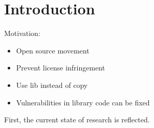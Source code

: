 
\chapter{Introduction}\label{chapter:introduction}
Motivation:
\begin{itemize}
    \item Open source movement
    \item Prevent license infringement
    \item Use lib instead of copy
    \item Vulnerabilities in library code can be fixed
\end{itemize}


First, the current state of research is reflected.